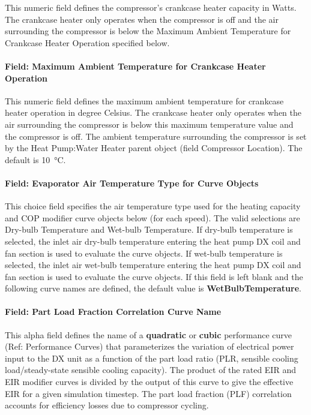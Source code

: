 This numeric field defines the compressor's crankcase heater capacity in Watts.
The crankcase heater only operates when the compressor is off and the air surrounding the compressor is below the Maximum Ambient Temperature for Crankcase Heater Operation specified below.


\paragraph{Field: Maximum Ambient Temperature for Crankcase Heater Operation}\label{vshpwhheating-maximum-ambient-temperature-for-crankcase-heater-operation}

This numeric field defines the maximum ambient temperature for crankcase heater operation in degree Celsius.
The crankcase heater only operates when the air surrounding the compressor is below this maximum temperature value and the compressor is off.
The ambient temperature surrounding the compressor is set by the Heat Pump:Water Heater parent object (field Compressor Location).
The default is \SI{10}{\celsius}.

\paragraph{Field: Evaporator Air Temperature Type for Curve Objects}\label{vshpwhheating-evaporator-air-temperature-type-for-curve-objects}

This choice field specifies the air temperature type used for the heating capacity and COP modifier curve objects below (for each speed).
The valid selections are Dry-bulb Temperature and Wet-bulb Temperature.
If dry-bulb temperature is selected, the inlet air dry-bulb temperature entering the heat pump DX coil and fan section is used to evaluate the curve objects.
If wet-bulb temperature is selected, the inlet air wet-bulb temperature entering the heat pump DX coil and fan section is used to evaluate the curve objects.
If this field is left blank and the following curve names are defined, the default value is \textbf{WetBulbTemperature}.


\paragraph{Field: Part Load Fraction Correlation Curve Name}\label{vshpwhheating-part-load-fraction-correlation-curve-name}

This alpha field defines the name of a \textbf{quadratic} or \textbf{cubic} performance curve (Ref: Performance Curves) that parameterizes the variation of electrical power input to the DX unit as a function of the part load ratio (PLR, sensible cooling load/steady-state sensible cooling capacity).
The product of the rated EIR and EIR modifier curves is divided by the output of this curve to give the effective EIR for a given simulation timestep.
The part load fraction (PLF) correlation accounts for efficiency losses due to compressor cycling.

